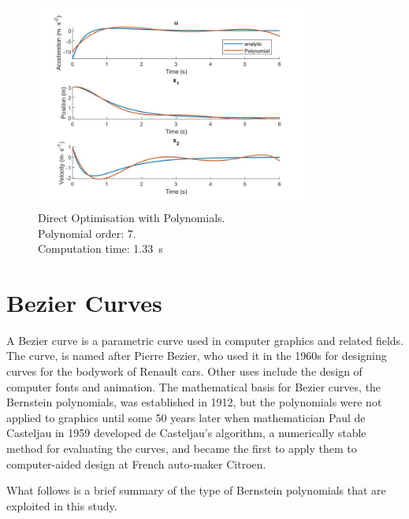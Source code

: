 \begin{figure}[h!]
\centering
\includegraphics[width=0.8\textwidth]{Images/solution_pol.jpg}
\caption{Direct Optimisation with Polynomials. \\ Polynomial order: 7. \\
Computation time: \SI{1.33}{\second}}
\label{fig:solution_pol}
\end{figure}



\section{Bezier Curves}
\label{sec:bezcurves}
\par A Bezier curve is a parametric curve used in computer graphics and related fields. The curve, is named after Pierre Bezier, who used it in the 1960s for designing curves for the bodywork of Renault cars. \cite{hazewinkelmichiel1997} Other uses include the design of computer fonts and animation. \cite{hazewinkelmichiel1997}
The mathematical basis for Bezier curves, the Bernstein polynomials, was established in 1912, but the polynomials were not applied to graphics until some 50 years later when mathematician Paul de Casteljau in 1959 developed de Casteljau's algorithm, a numerically stable method for evaluating the curves, and became the first to apply them to computer-aided design at French auto-maker Citroen. \cite{GeraldFarin2002}

\par What follows is a brief summary of the type of Bernstein polynomials that are exploited in this study.


